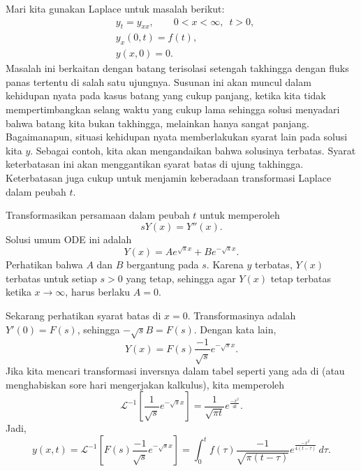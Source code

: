 \begin{example}
Mari kita gunakan Laplace untuk masalah berikut:
\begin{align*}
& y_t = y_{xx}, \qquad 0 < x < \infty, \enspace t > 0,\\
& y_x(0,t) = f(t), \\
& y(x,0) = 0 .
\end{align*}
Masalah ini berkaitan dengan batang terisolasi setengah takhingga dengan
fluks panas tertentu di salah satu ujungnya.
Susunan ini akan muncul dalam kehidupan nyata pada kasus
batang yang cukup panjang, ketika kita tidak mempertimbangkan selang waktu yang cukup lama
sehingga solusi menyadari bahwa batang kita bukan takhingga, melainkan hanya
sangat panjang.
Bagaimanapun, situasi kehidupan nyata memberlakukan syarat lain
pada solusi kita $y$.
Sebagai contoh, kita akan mengandaikan bahwa solusinya terbatas.
Syarat keterbatasan ini akan menggantikan syarat batas di
ujung takhingga.
Keterbatasan
juga cukup untuk menjamin keberadaan transformasi Laplace dalam peubah $t$.

Transformasikan persamaan dalam peubah $t$ untuk memperoleh
\begin{equation*}
sY(x) = Y''(x) .
\end{equation*}
Solusi umum ODE ini adalah
\begin{equation*}
Y(x) = A e^{\sqrt{s}x} + B e^{-\sqrt{s} x} .
\end{equation*}
Perhatikan bahwa $A$ dan $B$ bergantung pada $s$.
Karena $y$ terbatas, $Y(x)$ terbatas untuk setiap $s > 0$ yang tetap,
sehingga agar $Y(x)$ tetap terbatas ketika $x \to \infty$, harus berlaku $A=0$.

Sekarang perhatikan syarat batas di $x=0$.
Transformasinya adalah $Y'(0) = F(s)$, sehingga $-\sqrt{s}B = F(s)$.
Dengan kata lain,
\begin{equation*}
Y(x) = F(s) \frac{-1}{\sqrt{s}} e^{-\sqrt{s} x} .
\end{equation*}
Jika kita mencari transformasi inversnya dalam tabel seperti yang ada di
 (atau menghabiskan sore hari
mengerjakan kalkulus),
kita memperoleh 
\begin{equation*}
{\mathcal L}^{-1}\left[\frac{1}{\sqrt{s}} e^{-\sqrt{s} x}\right] =
\frac{1}{\sqrt{\pi t}} e^{\frac{-x^2}{4t}} .
\end{equation*}
Jadi,
\begin{equation*}
y(x,t) =
{\mathcal L}^{-1} \left[
F(s) \frac{-1}{\sqrt{s}} e^{-\sqrt{s} x}\right]
=
\int_0^t
f(\tau) 
\frac{-1}{\sqrt{\pi {(t-\tau)}}} e^{\frac{-x^2}{4(t-\tau)}} \, d\tau .
\end{equation*}
\end{example}

